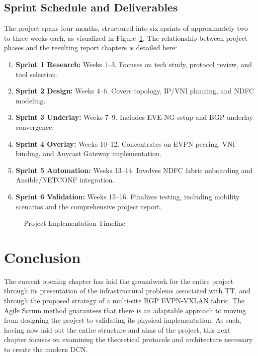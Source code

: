 \subsection{Sprint Schedule and Deliverables}
The project spans four months, structured into six sprints of approximately two to three weeks each, as visualized in Figure~\ref{fig:sprint_timeline}. The relationship between project phases and the resulting report chapters is detailed here:
\begin{enumerate}
    \item \textbf{Sprint 1 Research:} Weeks 1–3. Focuses on tech study, protocol review, and tool selection.
    \item \textbf{Sprint 2 Design:} Weeks 4–6. Covers topology, IP/VNI planning, and NDFC modeling.
    \item \textbf{Sprint 3 Underlay:} Weeks 7–9. Includes EVE-NG setup and BGP underlay convergence.
    \item \textbf{Sprint 4 Overlay:} Weeks 10–12. Concentrates on EVPN peering, VNI binding, and Anycast Gateway implementation.
    \item \textbf{Sprint 5 Automation:} Weeks 13–14. Involves NDFC fabric onboarding and Ansible/NETCONF integration.
    \item \textbf{Sprint 6 Validation:} Weeks 15–16. Finalizes testing, including mobility scenarios and the comprehensive project report.
\end{enumerate}

\begin{figure}[htbp]
    \centering
    \agiletimeline
    \caption{Project Implementation Timeline}
    \label{fig:sprint_timeline}
\end{figure}

\section{Conclusion}
The current opening chapter has laid the groundwork for the entire project through its presentation of the infrastructural problems associated with TT, and through the proposed strategy of a multi-site BGP EVPN-VXLAN fabric. The Agile Scrum method guarantees that there is an adaptable approach to moving from designing the project to validating its physical implementation. As such, having now laid out the entire structure and aims of the project, this next chapter focuses on examining the theoretical protocols and architecture necessary to create the modern DCN.